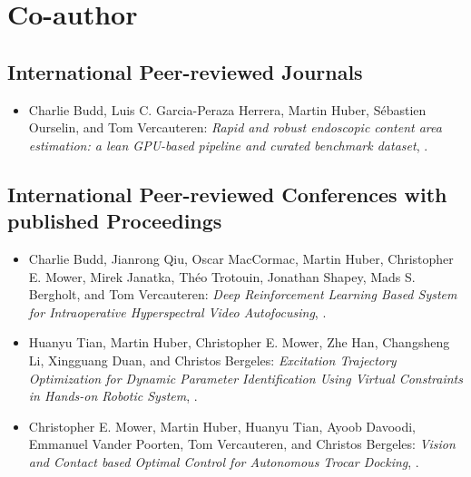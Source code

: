 \section*{Co-author}
\subsection*{International Peer-reviewed Journals}
\begin{itemize}
    \item Charlie Budd, Luis C. Garcia-Peraza Herrera, Martin Huber, S\'{e}bastien Ourselin, and Tom Vercauteren: \textit{Rapid and robust endoscopic content area estimation: a lean GPU-based pipeline and curated benchmark dataset}, \cite{budd2022rapid}.   
\end{itemize}

\subsection*{International Peer-reviewed Conferences with published Proceedings}
\begin{itemize}
    \item Charlie Budd, Jianrong Qiu, Oscar MacCormac, Martin Huber, Christopher E. Mower, Mirek Janatka, Th{\'e}o Trotouin, Jonathan Shapey, Mads S. Bergholt, and Tom Vercauteren: \textit{Deep Reinforcement Learning Based System for Intraoperative Hyperspectral Video Autofocusing}, \cite{budd2023deep}.
    \item Huanyu Tian, Martin Huber, Christopher E. Mower, Zhe Han, Changsheng Li, Xingguang Duan, and Christos Bergeles: \textit{Excitation Trajectory Optimization for Dynamic Parameter Identification Using Virtual Constraints in Hands-on Robotic System}, \cite{tian2024excitation}.
    \item Christopher E. Mower, Martin Huber, Huanyu Tian, Ayoob Davoodi, Emmanuel Vander Poorten, Tom Vercauteren, and Christos Bergeles: \textit{Vision and Contact based Optimal Control for Autonomous Trocar Docking}, \cite{mowervision}.
\end{itemize}

